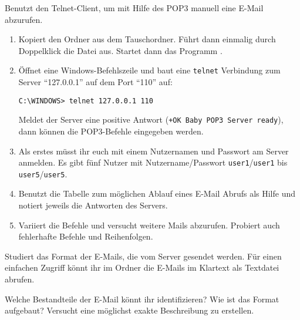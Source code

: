 \documentclass[10pt, a4paper]{scrartcl}
\begin{document}
\begin{aufgabe}
	Benutzt den Telnet-Client, um mit Hilfe des POP3 manuell eine E-Mail abzurufen.
	
	\begin{enumerate}
		\item Kopiert den Ordner  aus dem Tauschordner. Führt dann einmalig durch Doppelklick die Datei  aus. Startet dann das Programm .
		\item Öffnet eine Windows-Befehlszeile und baut eine \texttt{telnet} Verbindung zum Server \enquote{127.0.0.1} auf dem Port \enquote{110} auf:

		\begin{center}
			\verb|C:\WINDOWS> telnet 127.0.0.1 110|
		\end{center}
		
		Meldet der Server eine positive Antwort (\verb|+OK Baby POP3 Server ready|), dann können die POP3-Befehle eingegeben werden.
		\item Als erstes müsst ihr euch mit einem Nutzernamen und Passwort am Server anmelden. Es gibt fünf Nutzer mit Nutzername/Passwort \texttt{user1}/\texttt{user1} bis \texttt{user5}/\texttt{user5}.
		\item Benutzt die Tabelle zum möglichen Ablauf eines E-Mail Abrufs als Hilfe und notiert jeweils die Antworten des Servers.
		\item Variiert die Befehle und versucht weitere Mails abzurufen. Probiert auch fehlerhafte Befehle und Reihenfolgen.
	\end{enumerate}
\end{aufgabe}

\begin{aufgabe}
	Studiert das Format der E-Mails, die vom Server gesendet werden. Für einen einfachen Zugriff könnt ihr im Ordner  die E-Mails im Klartext als Textdatei abrufen.
	
	\medskip
	Welche Bestandteile der E-Mail könnt ihr identifizieren? Wie ist das Format aufgebaut? Versucht eine möglichst exakte Beschreibung zu erstellen.
\end{aufgabe}
\end{document}
